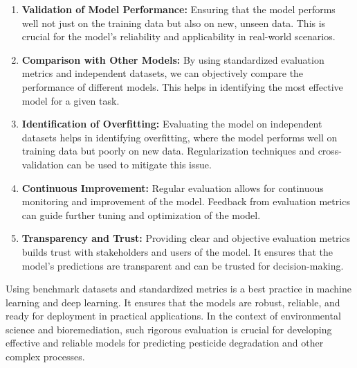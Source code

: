\begin{enumerate}
    \item \textbf{Validation of Model Performance:} Ensuring that the model performs well not just on the training data but also on new, unseen data. This is crucial for the model's reliability and applicability in real-world scenarios.
    \item \textbf{Comparison with Other Models:} By using standardized evaluation metrics and independent datasets, we can objectively compare the performance of different models. This helps in identifying the most effective model for a given task.
    \item \textbf{Identification of Overfitting:} Evaluating the model on independent datasets helps in identifying overfitting, where the model performs well on training data but poorly on new data. Regularization techniques and cross-validation can be used to mitigate this issue.
    \item \textbf{Continuous Improvement:} Regular evaluation allows for continuous monitoring and improvement of the model. Feedback from evaluation metrics can guide further tuning and optimization of the model.
    \item \textbf{Transparency and Trust:} Providing clear and objective evaluation metrics builds trust with stakeholders and users of the model. It ensures that the model’s predictions are transparent and can be trusted for decision-making.
\end{enumerate}

Using benchmark datasets and standardized metrics is a best practice in machine learning and deep learning. It ensures that the models are robust, reliable, and ready for deployment in practical applications. In the context of environmental science and bioremediation, such rigorous evaluation is crucial for developing effective and reliable models for predicting pesticide degradation and other complex processes.